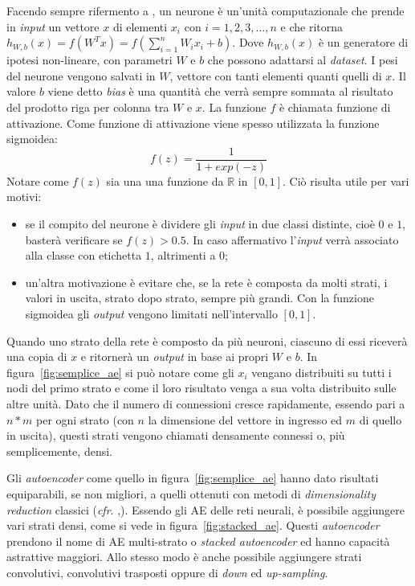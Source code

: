 Facendo sempre rifermento a \cite{ng_sparse_ae}, un neurone è un'unità computazionale che prende in \textit{input} un vettore $x$ di elementi $x_i$ con $i=1,2,3,\dots,n$ e che ritorna $h_{W,b}(x) = f(W^Tx) = f(\sum_{i=1}^{n} W_i x_i + b)$.
Dove $h_{W,b}(x)$ è un generatore di ipotesi non-lineare, con parametri $W$ e $b$ che possono adattarsi al \textit{dataset}.
I pesi del neurone vengono salvati in $W$, vettore con tanti elementi quanti quelli di $x$.
Il valore $b$ viene detto \textit{bias} è una quantità che verrà sempre sommata al risultato del prodotto riga per colonna tra $W$ e $x$.
La funzione $f$ è chiamata funzione di attivazione.
Come funzione di attivazione viene spesso utilizzata la funzione sigmoidea:
\begin{equation*}
  f(z) = \frac{1}{1 + exp(-z)}
\end{equation*} %
Notare come $f(z)$ sia una una funzione da $\mathbb{R}$ in $[0,1]$.
Ciò risulta utile per vari motivi:
\begin{itemize}
  \item se il compito del neurone è dividere gli \textit{input} in due classi distinte, cioè $0$ e $1$, basterà verificare se $f(z)>0.5$.
    In caso affermativo l'\textit{input} verrà associato alla classe con etichetta $1$, altrimenti a $0$;
  \item un'altra motivazione è evitare che, se la rete è composta da molti strati, i valori in uscita, strato dopo strato, sempre più grandi. Con la funzione sigmoidea gli \textit{output} vengono limitati nell'intervallo $[0,1]$.
\end{itemize}

Quando uno strato della rete è composto da più neuroni, ciascuno di essi riceverà una copia di $x$ e ritornerà un \textit{output} in base ai propri $W$ e $b$.
In figura~\ref{fig:semplice_ae} si può notare come gli $x_i$ vengano distribuiti su tutti i nodi del primo strato e come il loro risultato venga a sua volta distribuito sulle altre unità.
Dato che il numero di connessioni cresce rapidamente, essendo pari a $n*m$ per ogni strato (con $n$ la dimensione del vettore in ingresso ed $m$ di quello in uscita), questi strati vengono chiamati densamente connessi o, più semplicemente, densi.

Gli \textit{autoencoder} come quello in figura~\ref{fig:semplice_ae} hanno dato risultati equiparabili, se non migliori, a quelli ottenuti con metodi di \textit{dimensionality reduction} classici (\textit{cfr}. \cite{ng_sparse_ae},\cite{pca_vs_ae_1}).
Essendo gli AE delle reti neurali, è possibile aggiungere vari strati densi, come si vede in figura~\ref{fig:stacked_ae}.
Questi \textit{autoencoder} prendono il nome di AE multi-strato o \textit{stacked autoencoder} ed hanno capacità astrattive maggiori. %
Allo stesso modo è anche possibile aggiungere strati convolutivi, convolutivi trasposti oppure di \textit{down} ed \textit{up-sampling}.

